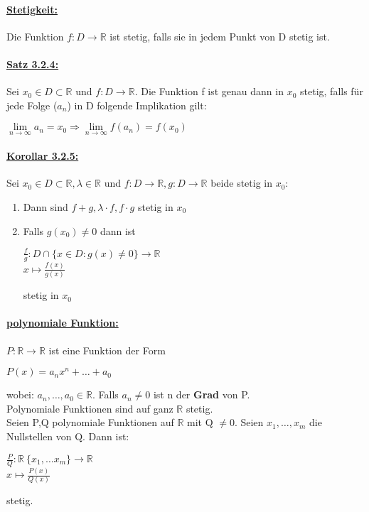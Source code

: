 \documentclass[8pt]{extreport}
\begin{document}
\paragraph{\underline{Stetigkeit:}} Die Funktion $ f: D \rightarrow \mathbb{R}$ ist stetig, falls sie in jedem Punkt von D stetig ist.
\paragraph{\underline{Satz 3.2.4:}} Sei $x_0 \in D \subset \mathbb{R}$ und $ f: D \rightarrow \mathbb{R}$. Die Funktion f ist genau dann in $x_0$ stetig, falls für jede Folge ($a_n$) in D folgende Implikation gilt:
\begin{center}
$\lim\limits_{n \to \infty} a_n = x_0 \Rightarrow \lim\limits_{n \to \infty} f(a_n) = f(x_0)$
\end{center}
\paragraph{\underline{Korollar 3.2.5:}} Sei $x_0 \in D \subset \mathbb{R}, \lambda \in \mathbb{R}$ und $f:D \rightarrow \mathbb{R}, g: D \rightarrow \mathbb{R}$ beide stetig in $x_0$:
\begin{enumerate}
\item Dann sind $f + g, \lambda \cdot f, f\cdot g$ stetig in $x_0$
\item Falls $g(x_0) \neq 0$ dann ist 
\begin{center}
$\frac{f}{g} : D \cap \{x \in D : g(x) \neq 0\} \rightarrow \mathbb{R}$\\
$x \mapsto \frac{f(x)}{g(x)}$
\end{center}
stetig in $x_0$
\end{enumerate}
\paragraph{\underline{polynomiale Funktion:}} $P: \mathbb{R} \rightarrow \mathbb{R}$ ist eine Funktion der Form
\begin{center}
$P(x) = a_nx^n+ \dots + a_0$
\end{center}
wobei: $a_n, \dots, a_0 \in \mathbb{R}.$ Falls $a_n \neq 0$ ist n der \textbf{Grad} von P.\\
Polynomiale Funktionen sind auf ganz $\mathbb{R}$ stetig.\\
Seien P,Q polynomiale Funktionen auf $ \mathbb{R}$ mit Q $\neq \mathit{0}$. Seien $x_1,\dots,x_m$ die Nullstellen von Q. Dann ist:
\begin{center}
$\frac{P}{Q} : \mathbb{R} \ \{x_1,\dots x_m\} \rightarrow \mathbb{R}$\\
$ x \mapsto \frac{P(x)}{Q(x)}$

\end{center}
stetig.
\end{document}
